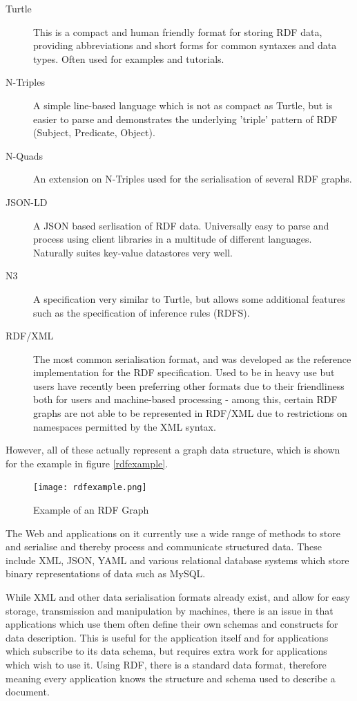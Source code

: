\documentclass{article}
\begin{document}
\begin{description}
    \item[Turtle] This is a compact and human friendly format for storing RDF
    data, providing abbreviations and short forms for common syntaxes and
    data types. Often used for examples and tutorials.\cite{turtle}
    \item[N-Triples] A simple line-based language which is not as compact as 
    Turtle, but is easier to parse and demonstrates the underlying 'triple'
    pattern of RDF (Subject, Predicate, Object).\cite{ntriples}
    \item[N-Quads] An extension on N-Triples used for the serialisation of
    several RDF graphs.
    \item[JSON-LD] A JSON based serlisation of RDF data. Universally easy to
    parse and process using client libraries in a multitude of different
    languages. Naturally suites key-value datastores very well.
    \item[N3] A specification very similar to Turtle, but allows some additional
    features such as the specification of inference rules (RDFS).
    \item[RDF/XML] The most common serialisation format, and was developed as
    the reference implementation for the RDF specification. Used to be in heavy
    use but users have recently been preferring other formats due to their
    friendliness both for users and machine-based processing - among this,
    certain RDF graphs are not able to be represented in RDF/XML due to
    restrictions on namespaces permitted by the XML syntax.
\end{description}

However, all of these actually represent a graph data structure, which is shown
for the example in figure \ref{rdfexample}.

\begin{figure}[h!]
  \centering
  \texttt{[image: rdfexample.png]}
  \caption{Example of an RDF Graph}
  \label{fig:rdfexample}
\end{figure}

The Web and applications on it currently use a wide range of methods to store
and serialise and thereby process and communicate structured data. These include 
XML, JSON, YAML and various relational database systems which store binary
representations of data such as MySQL.

While XML and other data serialisation formats already exist, and allow for easy 
storage, transmission and manipulation by machines, there is an issue in that 
applications which use them often define their own schemas and constructs for 
data description. This is useful for the application itself and for applications 
which subscribe to its data schema, but requires extra work for applications which 
wish to use it. Using RDF, there is a standard data format, therefore meaning
every application knows the structure and schema used to describe a document.
\end{document}
